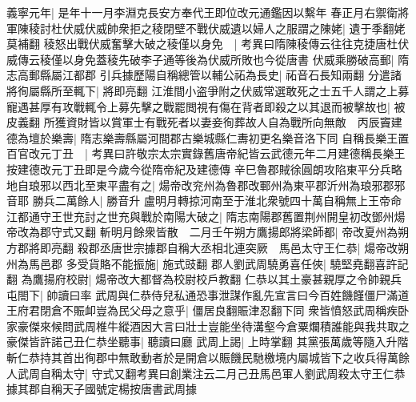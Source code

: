 義寧元年|{
	是年十一月李淵克長安方奉代王即位改元通鑑因以繫年}
春正月右禦衛將軍陳稜討杜伏威伏威帥衆拒之稜閉壁不戰伏威遺以婦人之服謂之陳姥|{
	遺于季翻姥莫補翻}
稜怒出戰伏威奮擊大破之稜僅以身免　|{
	考異曰隋陳稜傳云往往克捷唐杜伏威傳云稜僅以身免蓋稜先破李子通等後為伏威所敗也今從唐書}
伏威乘勝破高郵|{
	隋志高郵縣屬江都郡}
引兵據歷陽自稱總管以輔公祏為長史|{
	祏音石長知兩翻}
分遣諸將徇屬縣所至輒下|{
	將即亮翻}
江淮間小盗爭附之伏威常選敢死之士五千人謂之上募寵遇甚厚有攻戰輒令上募先擊之戰罷閲視有傷在背者即殺之以其退而被擊故也|{
	被皮義翻}
所獲資財皆以賞軍士有戰死者以妻妾徇葬故人自為戰所向無敵　丙辰竇建德為壇於樂壽|{
	隋志樂壽縣屬河間郡古樂城縣仁夀初更名樂音洛下同}
自稱長樂王置百官改元丁丑　|{
	考異曰許敬宗太宗實錄舊唐帝紀皆云武德元年二月建德稱長樂王按建德改元丁丑即是今歲今從隋帝紀及建德傳}
辛巳魯郡賊徐圓朗攻陷東平分兵略地自琅邪以西北至東平盡有之|{
	煬帝改兖州為魯郡改鄆州為東平郡沂州為琅邪郡邪音耶}
勝兵二萬餘人|{
	勝音升}
盧明月轉掠河南至于淮北衆號四十萬自稱無上王帝命江都通守王世充討之世充與戰於南陽大破之|{
	隋志南陽郡舊置荆州開皇初改鄧州煬帝改為郡守式又翻}
斬明月餘衆皆散　二月壬午朔方鷹揚郎將梁師都|{
	帝改夏州為朔方郡將即亮翻}
殺郡丞唐世宗據郡自稱大丞相北連突厥　馬邑太守王仁恭|{
	煬帝改朔州為馬邑郡}
多受貨賂不能振施|{
	施式豉翻}
郡人劉武周驍勇喜任俠|{
	驍堅堯翻喜許記翻}
為鷹揚府校尉|{
	煬帝改大都督為校尉校戶教翻}
仁恭以其土豪甚親厚之令帥親兵屯閤下|{
	帥讀曰率}
武周與仁恭侍兒私通恐事泄謀作亂先宣言曰今百姓饑饉僵尸滿道王府君閉倉不賑卹豈為民父母之意乎|{
	僵居良翻賑津忍翻下同}
衆皆憤怒武周稱疾卧家豪傑來候問武周椎牛縱酒因大言曰壯士豈能坐待溝壑今倉粟爛積誰能與我共取之豪傑皆許諾己丑仁恭坐聽事|{
	聽讀曰廳}
武周上謁|{
	上時掌翻}
其黨張萬歲等隨入升階斬仁恭持其首出徇郡中無敢動者於是開倉以賑饑民馳檄境内屬城皆下之收兵得萬餘人武周自稱太守|{
	守式又翻考異曰創業注云二月己丑馬邑軍人劉武周殺太守王仁恭據其郡自稱天子國號定楊按唐書武周據}


